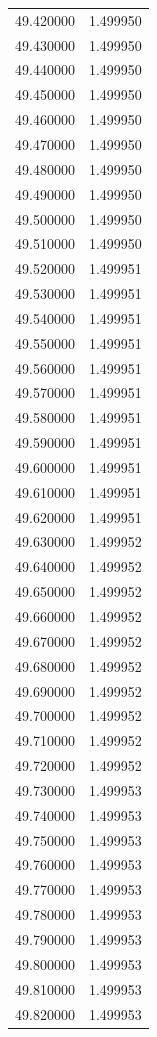\begin{tabular}{rr}
49.420000 & 1.499950 \\
49.430000 & 1.499950 \\
49.440000 & 1.499950 \\
49.450000 & 1.499950 \\
49.460000 & 1.499950 \\
49.470000 & 1.499950 \\
49.480000 & 1.499950 \\
49.490000 & 1.499950 \\
49.500000 & 1.499950 \\
49.510000 & 1.499950 \\
49.520000 & 1.499951 \\
49.530000 & 1.499951 \\
49.540000 & 1.499951 \\
49.550000 & 1.499951 \\
49.560000 & 1.499951 \\
49.570000 & 1.499951 \\
49.580000 & 1.499951 \\
49.590000 & 1.499951 \\
49.600000 & 1.499951 \\
49.610000 & 1.499951 \\
49.620000 & 1.499951 \\
49.630000 & 1.499952 \\
49.640000 & 1.499952 \\
49.650000 & 1.499952 \\
49.660000 & 1.499952 \\
49.670000 & 1.499952 \\
49.680000 & 1.499952 \\
49.690000 & 1.499952 \\
49.700000 & 1.499952 \\
49.710000 & 1.499952 \\
49.720000 & 1.499952 \\
49.730000 & 1.499953 \\
49.740000 & 1.499953 \\
49.750000 & 1.499953 \\
49.760000 & 1.499953 \\
49.770000 & 1.499953 \\
49.780000 & 1.499953 \\
49.790000 & 1.499953 \\
49.800000 & 1.499953 \\
49.810000 & 1.499953 \\
49.820000 & 1.499953 \\

\end{tabular}
